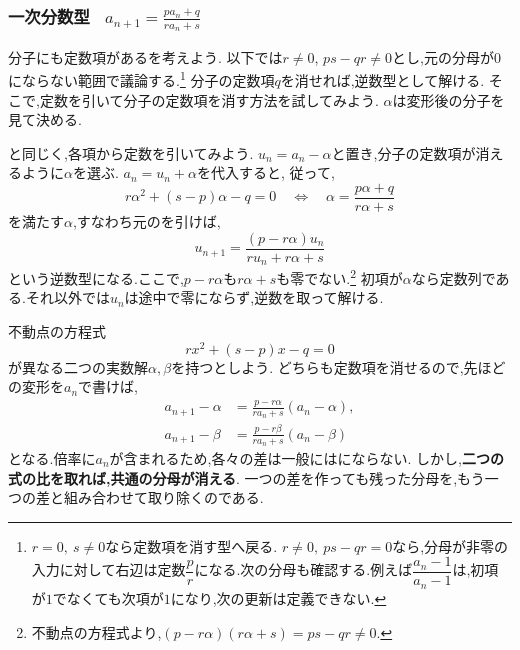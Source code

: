 
\subsubsection{\texorpdfstring{一次分数型  \, $\displaystyle a_{n+1}=\frac{pa_n+q}{ra_n+s}$}{一次分数型}}\label{節：1次分数型}
    分子にも定数項があるを考えよう.
    以下では$r\ne0$, $ps-qr\ne0$とし,元の分母が$0$にならない範囲で議論する.\footnote{$r=0,\ s\ne0$なら定数項を消す型へ戻る.
    $r\ne0,\ ps-qr=0$なら,分母が非零の入力に対して右辺は定数$\dfrac{p}{r}$になる.次の分母も確認する.例えば$\dfrac{a_n-1}{a_n-1}$は,初項が$1$でなくても次項が$1$になり,次の更新は定義できない.}
    分子の定数項$q$を消せれば,逆数型として解ける.
    そこで,定数を引いて分子の定数項を消す方法を試してみよう.
    $\alpha$は変形後の分子を見て決める.

    と同じく,各項から定数を引いてみよう.
    $u_n=a_n-\alpha$と置き,分子の定数項が消えるように$\alpha$を選ぶ.
    $a_n=u_n+\alpha$を代入すると,
    従って,
    \[
      r\alpha^2+(s-p)\alpha-q=0
      \quad\Longleftrightarrow\quad
      \alpha=\frac{p\alpha+q}{r\alpha+s}
    \]
    を満たす$\alpha$,すなわち元のを引けば,
    \[
      u_{n+1}=\frac{(p-r\alpha)u_n}{ru_n+r\alpha+s}
    \]
    という逆数型になる.ここで,$p-r\alpha$も$r\alpha+s$も零でない.\footnote{不動点の方程式より,$(p-r\alpha)(r\alpha+s)=ps-qr\ne0$.}
    初項が$\alpha$なら定数列である.それ以外では$u_n$は途中で零にならず,逆数を取って解ける.

    不動点の方程式
    \[
      rx^2+(s-p)x-q=0
    \]
    が異なる二つの実数解$\alpha,\beta$を持つとしよう.
    どちらも定数項を消せるので,先ほどの変形を$a_n$で書けば,
    \begin{align*}
      a_{n+1}-\alpha
      &=\frac{p-r\alpha}{ra_n+s}(a_n-\alpha),\\
      a_{n+1}-\beta
      &=\frac{p-r\beta}{ra_n+s}(a_n-\beta)
    \end{align*}
    となる.倍率に$a_n$が含まれるため,各々の差は一般にはにならない.
    しかし,\textbf{二つの式の比を取れば,共通の分母が消える}.
    一つの差を作っても残った分母を,もう一つの差と組み合わせて取り除くのである.

